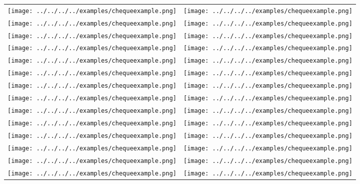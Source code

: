 \documentclass{article}%
\begin{document}
\newpage%
\begin{longtabu}{X[c] X[c]}%
\texttt{[image: ../../../../examples/chequeexample.png]}&\texttt{[image: ../../../../examples/chequeexample.png]}\\%
\texttt{[image: ../../../../examples/chequeexample.png]}&\texttt{[image: ../../../../examples/chequeexample.png]}\\%
\texttt{[image: ../../../../examples/chequeexample.png]}&\texttt{[image: ../../../../examples/chequeexample.png]}\\%
\texttt{[image: ../../../../examples/chequeexample.png]}&\texttt{[image: ../../../../examples/chequeexample.png]}\\%
\texttt{[image: ../../../../examples/chequeexample.png]}&\texttt{[image: ../../../../examples/chequeexample.png]}\\%
\texttt{[image: ../../../../examples/chequeexample.png]}&\texttt{[image: ../../../../examples/chequeexample.png]}\\%
\texttt{[image: ../../../../examples/chequeexample.png]}&\texttt{[image: ../../../../examples/chequeexample.png]}\\%
\texttt{[image: ../../../../examples/chequeexample.png]}&\texttt{[image: ../../../../examples/chequeexample.png]}\\%
\texttt{[image: ../../../../examples/chequeexample.png]}&\texttt{[image: ../../../../examples/chequeexample.png]}\\%
\texttt{[image: ../../../../examples/chequeexample.png]}&\texttt{[image: ../../../../examples/chequeexample.png]}\\%
\texttt{[image: ../../../../examples/chequeexample.png]}&\texttt{[image: ../../../../examples/chequeexample.png]}\\%
\texttt{[image: ../../../../examples/chequeexample.png]}&\texttt{[image: ../../../../examples/chequeexample.png]}\\%
\texttt{[image: ../../../../examples/chequeexample.png]}&\texttt{[image: ../../../../examples/chequeexample.png]}\\%
\texttt{[image: ../../../../examples/chequeexample.png]}&\texttt{[image: ../../../../examples/chequeexample.png]}\\%

\end{longtabu}
\end{document}
